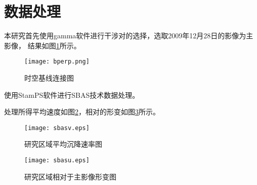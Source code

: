 \section{数据处理}

本研究首先使用gamma软件进行干涉对的选择，选取2009年12月28日的影像为主影像，
结果如图\ref{fig:bprep}所示。
\begin{figure}[htb]
    \centering
    \texttt{[image: bperp.png]}
    \caption{时空基线连接图}
    \label{fig:bprep}
\end{figure}
使用StamPS软件进行SBAS技术数据处理。

处理所得平均速度如图\ref{fig:sbasv}，相对的形变如图\ref{fig:sbasu}所示。
\begin{figure}[htb]
    \centering
    \texttt{[image: sbasv.eps]}
    \caption{研究区域平均沉降速率图}
    \label{fig:sbasv}
\end{figure}
\begin{figure}[htb]
    \centering
    \texttt{[image: sbasu.eps]}
    \caption{研究区域相对于主影像形变图}
    \label{fig:sbasu}
\end{figure}
